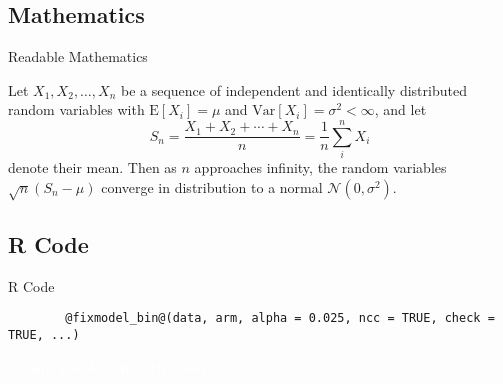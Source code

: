 \documentclass[10pt]{beamer} %
\begin{document}
\subsection{Mathematics}

\begin{frame}{Readable Mathematics}

Let $X_1, X_2, \ldots, X_n$ be a sequence of independent and identically distributed random variables with $\text{E}[X_i] = \mu$ and $\text{Var}[X_i] = \sigma^2 < \infty$, and let
$$S_n = \frac{X_1 + X_2 + \cdots + X_n}{n}
      = \frac{1}{n}\sum_{i}^{n} X_i$$
denote their mean. Then as $n$ approaches infinity, the random variables $\sqrt{n}(S_n - \mu)$ converge in distribution to a normal $\mathcal{N}(0, \sigma^2)$.

\end{frame}

\subsection{R Code}

\begin{frame}[fragile]{R Code}
	
	\begin{lstlisting}
		@fixmodel_bin@(data, arm, alpha = 0.025, ncc = TRUE, check = TRUE, ...)
	\end{lstlisting}  
	
\end{frame}



{\titlepageBluenNoFootline
	\begin{frame}
		
		\begin{center}
			\Large\textcolor{white}{\textbf{Thank you for the attention!}}
		\end{center}
		
	\end{frame}	
}
\end{document}
